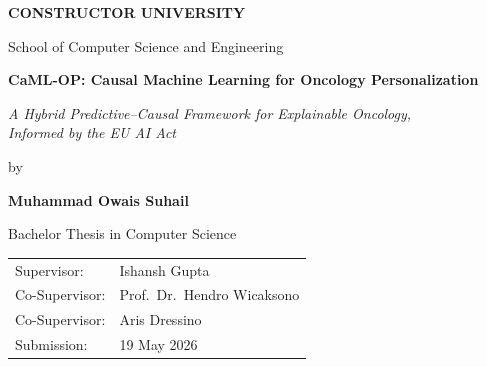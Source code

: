\documentclass[11pt,a4paper,oneside]{report}
\begin{document}
\begin{titlepage}
\centering
{\Large\bfseries CONSTRUCTOR UNIVERSITY\par}
\vspace{0.3cm}
{\large School of Computer Science and Engineering\par}
\vfill
{\huge\bfseries CaML-OP: Causal Machine Learning for Oncology Personalization\par}
\vspace{0.8cm}
{\large\itshape A Hybrid Predictive--Causal Framework for Explainable Oncology,\\
Informed by the EU AI Act\par}
\vfill
{\large by\par}
\vspace{0.4cm}
{\Large\bfseries Muhammad Owais Suhail\par}
\vspace{1.2cm}
{\large Bachelor Thesis in Computer Science\par}
\vfill
\begin{flushleft}
\large
\hspace{2cm}\begin{tabular}{@{}ll@{}}
Supervisor: & Ishansh Gupta\\[4pt]
Co-Supervisor: & Prof.\ Dr.\ Hendro Wicaksono\\[4pt]
Co-Supervisor: & Aris Dressino\\[4pt]
Submission: & 19 May 2026\\
\end{tabular}
\end{flushleft}
\vspace{1cm}
\end{titlepage}

\setcounter{page}{1}



\cleardoublepage
\tableofcontents
\cleardoublepage
\listoffigures
\cleardoublepage
\listoftables
\cleardoublepage

\setcounter{page}{1}




\end{document}
